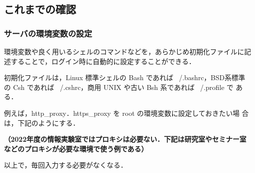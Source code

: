 \clearpage

\subsection*{これまでの確認}

\subsubsection*{サーバの環境変数の設定}

環境変数や良く用いるシェルのコマンドなどを，あらかじめ初期化ファイルに記
述することで，ログイン時に自動的に設定することができる．

初期化ファイルは，Linux 標準シェルの Bash であれば ~/.bashrc，BSD系標準
の Csh であれば ~/.cshrc，商用 UNIX や古い Bsh 系であれば ~/.profile で
ある．

例えば，http\_proxy．https\_proxy を root の環境変数に設定しておきたい場
合は，下記のようにする．

\textbf{（2022年度の情報実験室ではプロキシは必要ない．下記は研究室やセミナー室などのプロキシが必要な環境で使う例である）}


以上で，毎回入力する必要がなくなる．
